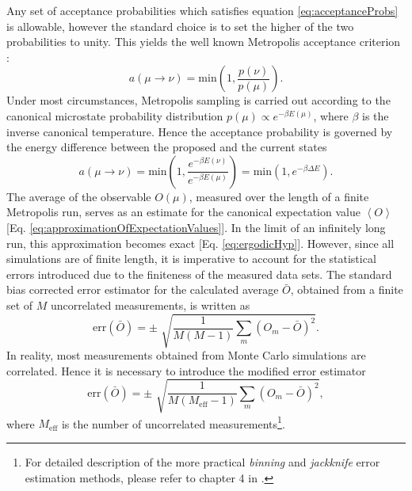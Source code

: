 \documentclass[12pt]{report}
\begin{document}
Any set of acceptance probabilities which satisfies equation \ref{eq:acceptanceProbs} is allowable, however the standard choice is to set the higher of the two probabilities to unity. This yields the well known Metropolis acceptance criterion \cite{Landau2000,Metropolis1953}:
%
\begin{equation}
\label{eq:MetropolisCriterion}
a\left(\mu \rightarrow \nu\right) = \mathrm{min}\left(1,\frac{p\left(\nu\right)}{p\left(\mu\right)} \right).
\end{equation}
% 
Under most circumstances, Metropolis sampling is carried out according to the canonical microstate probability distribution $p(\mu) \propto e^{-\beta E(\mu)}$, where $\beta$ is the inverse canonical temperature. Hence the acceptance probability is governed by the energy difference between the proposed and the current states
%
\begin{equation}
\label{eq:MetropolisCriterionCanonical}
a\left(\mu \rightarrow \nu\right) = \mathrm{min}\left(1,\frac{e^{-\beta E(\nu)}}{e^{-\beta E(\mu)}} \right) = \mathrm{min}\left(1,e^{-\beta \Delta E} \right).
\end{equation}
%
The average of the observable $O(\mu)$, measured over the length of a finite Metropolis run, serves as an estimate for the canonical expectation value $\left\langle O \right\rangle$ [Eq.\,\,\ref{eq:approximationOfExpectationValues}]. 
In the limit of an infinitely long run, this approximation becomes exact [Eq.\,\,\ref{eq:ergodicHyp}]. However, since all simulations are of finite length, it is imperative to account for the statistical errors introduced due to the finiteness of the measured data sets. The standard bias corrected error estimator for the calculated average $\bar{O}$, obtained from a finite set of $M$ uncorrelated measurements, is written as
%
\begin{equation}
\mathrm{err}(\bar{O}) = \pm \,\,\sqrt{\frac{1}{M(M-1)} \sum_{m} (O_{m} - \bar{O})^{2}}.
\end{equation}
%
In reality, most measurements obtained from Monte Carlo simulations are correlated. Hence it is necessary to introduce the modified error estimator
%
\begin{equation}
\mathrm{err}(\bar{O}) = \pm \,\,\sqrt{\frac{1}{M(M_{\mathrm{eff}}-1)} \sum_{m} (O_{m} - \bar{O})^{2}},
\end{equation}
%
where $M_{\mathrm{eff}}$ is the number of uncorrelated measurements\footnote{For detailed description of the more practical \textit{binning} and \textit{jackknife} error estimation methods, please refer to chapter 4 in \cite{Bachmann2014}.}.
\end{document}
